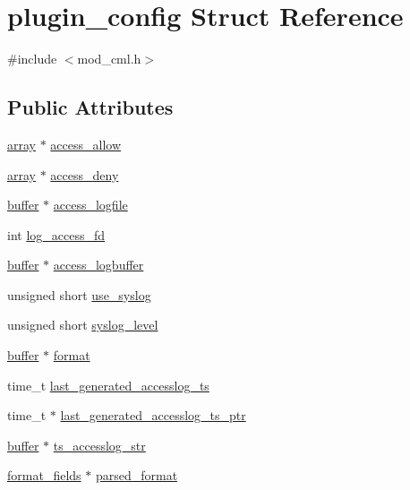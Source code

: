 \hypertarget{structplugin__config}{\section{plugin\-\_\-config Struct Reference}
\label{structplugin__config}
}


{\ttfamily \#include $<$mod\-\_\-cml.\-h$>$}

\subsection*{Public Attributes}
\begin{DoxyCompactItemize}
\item 
\hyperlink{structarray}{array} $\ast$ \hyperlink{structplugin__config_add01c632c0451007ebaf856a283e8617}{access\-\_\-allow}
\item 
\hyperlink{structarray}{array} $\ast$ \hyperlink{structplugin__config_af503027bbb7fb2345bf6ac966a3f94d4}{access\-\_\-deny}
\item 
\hyperlink{structbuffer}{buffer} $\ast$ \hyperlink{structplugin__config_a9f49dacad1547afc5c4f342e2785b890}{access\-\_\-logfile}
\item 
int \hyperlink{structplugin__config_ac2cfe959ecfdb9e94aa13fb163c58e85}{log\-\_\-access\-\_\-fd}
\item 
\hyperlink{structbuffer}{buffer} $\ast$ \hyperlink{structplugin__config_ac96f3c49710be2e36f04124164f3e68e}{access\-\_\-logbuffer}
\item 
unsigned short \hyperlink{structplugin__config_a0550af5388be0c53c8e7d608ab13223a}{use\-\_\-syslog}
\item 
unsigned short \hyperlink{structplugin__config_acbb7b526b9c8757f94957436a5ddcaf3}{syslog\-\_\-level}
\item 
\hyperlink{structbuffer}{buffer} $\ast$ \hyperlink{structplugin__config_af1cea69ff3a5d21625609be6668fa138}{format}
\item 
time\-\_\-t \hyperlink{structplugin__config_ae3bcf96bb33e24cd8757fc9a4c90825b}{last\-\_\-generated\-\_\-accesslog\-\_\-ts}
\item 
time\-\_\-t $\ast$ \hyperlink{structplugin__config_ad23655083ebea6a8d9f9a21c9827c7e7}{last\-\_\-generated\-\_\-accesslog\-\_\-ts\-\_\-ptr}
\item 
\hyperlink{structbuffer}{buffer} $\ast$ \hyperlink{structplugin__config_a4fbaad72d7ba8e7f74f52ab59f20a9e3}{ts\-\_\-accesslog\-\_\-str}
\item 
\hyperlink{structformat__fields}{format\-\_\-fields} $\ast$ \hyperlink{structplugin__config_a987497c9c45b892fd54523000650dd8a}{parsed\-\_\-format}

\end{DoxyCompactItemize}
